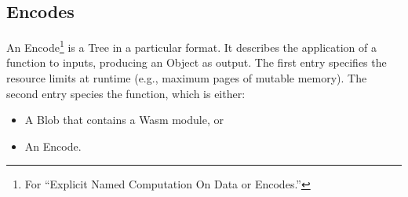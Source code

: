 \documentclass{article}
\newcommand{\blob}{\textrm{Blob}\xspace}
\newcommand{\valuex}{\textrm{Value}\xspace}
\newcommand{\valuexs}{\textrm{Value}s\xspace}
\newcommand{\object}{\textrm{Object}\xspace}
\newcommand{\encode}{\textrm{Encode}\xspace}
\newcommand{\thunk}{\textrm{Thunk}\xspace}
\newcommand{\thunks}{\textrm{Thunk}s\xspace}
\newcommand{\encodes}{\textrm{Encode}s\xspace}
\newcommand{\name}{\textrm{Name}\xspace}
\newcommand{\names}{\textrm{Name}s\xspace}
\newcommand{\tree}{\textrm{Tree}\xspace}
\newcommand{\bs}{\vspace{\baselineskip}}
\begin{document}

\subsection{\encodes}

An \encode\footnote{For ``Explicit Named Computation On Data or
\encodes.''} is a \tree in a particular format. It describes the
application of a function to inputs, producing an \object as
output. The first entry specifies the resource limits at runtime
(e.g., maximum pages of mutable memory). The second entry species the
function, which is either:
\begin{itemize}[itemsep=0pt]
\item A \blob that contains a Wasm module, or
\item An \encode.
\end{itemize}

\end{document}
